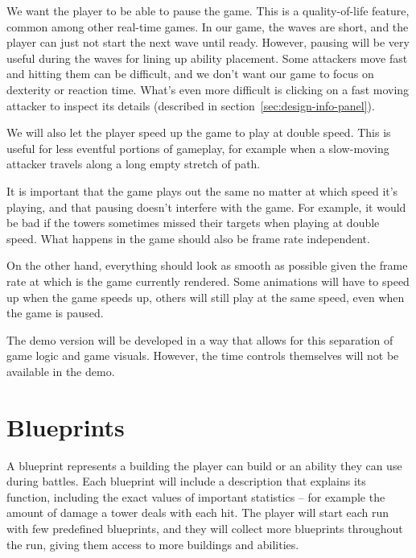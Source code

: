 \begin{notindemo}
    We want the player to be able to pause the game.
    This is a quality-of-life feature, common among other real-time games.
    In our game, the waves are short, and the player can just not start the next wave until ready.
    However, pausing will be very useful during the waves for lining up ability placement.
    Some attackers move fast and hitting them can be difficult, and we don't want our game to focus on dexterity or reaction time.
    What's even more difficult is clicking on a fast moving attacker to inspect its details (described in section~\ref{sec:design-info-panel}).

    We will also let the player speed up the game to play at double speed.
    This is useful for less eventful portions of gameplay, for example when a slow-moving attacker travels along a long empty stretch of path.

    It is important that the game plays out the same no matter at which speed it's playing, and that pausing doesn't interfere with the game.
    For example, it would be bad if the towers sometimes missed their targets when playing at double speed.
    What happens in the game should also be frame rate independent.

    On the other hand, everything should look as smooth as possible given the frame rate at which is the game currently rendered.
    Some animations will have to speed up when the game speeds up, others will still play at the same speed, even when the game is paused.
\end{notindemo}

The demo version will be developed in a way that allows for this separation of game logic and game visuals.
However, the time controls themselves will not be available in the demo.

\section{Blueprints}\label{sec:design-blueprints}

A blueprint represents a building the player can build or an ability they can use during battles.
Each blueprint will include a description that explains its function, including the exact values of important statistics -- for example the amount of damage a tower deals with each hit.
The player will start each run with few predefined blueprints, and they will collect more blueprints throughout the run, giving them access to more buildings and abilities.

